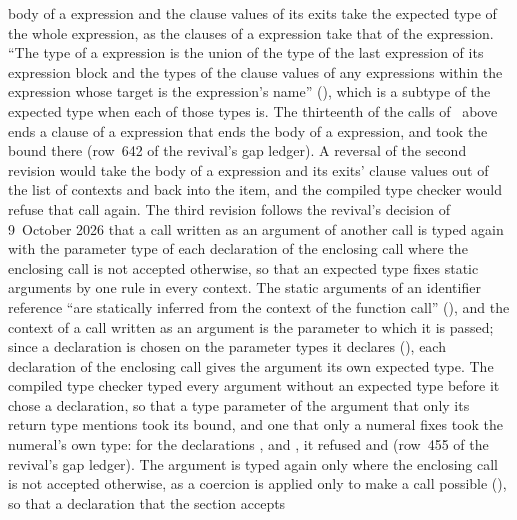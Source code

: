 \begin{description}
body of a  expression and the  clause values of its exits
take the expected type of the whole  expression, as the clauses of a
 expression take that of the  expression.
``The type of a  expression is the union of the type of the last
expression of its expression block and the types of the  clause
values of any  expressions within the  expression whose
target is the  expression's name'' (), which is a
subtype of the expected type when each of those types is.
The thirteenth of the calls of \library\ above ends a clause of a
 expression that ends the body of a  expression, and
took the bound  there (row~642 of the revival's gap ledger).
A reversal of the second revision would take the body of a 
expression and its exits'  clause values out of the list of contexts
and back into the item, and the compiled type checker would refuse that call
again.
The third revision follows the revival's decision of 9~October 2026 that a
call written as an argument of another call is typed again with the parameter
type of each declaration of the enclosing call where the enclosing call is not
accepted otherwise, so that an expected type fixes static arguments by one rule
in every context.
The static arguments of an identifier reference ``are statically inferred from
the context of the function call'' (), and the context of a
call written as an argument is the parameter to which it is passed; since a
declaration is chosen on the parameter types it declares
(), each declaration of the enclosing call gives
the argument its own expected type.
The compiled type checker typed every argument without an expected type before
it chose a declaration, so that a type parameter of the argument that only its
return type mentions took its bound, and one that only a numeral fixes took the
numeral's own type: for the declarations
,
and , it
refused  and 
(row~455 of the revival's gap ledger).
The argument is typed again only where the enclosing call is not accepted
otherwise, as a coercion is applied only to make a call possible
(), so that a declaration that the section accepts

\end{description}

